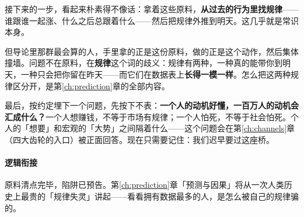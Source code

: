 \documentclass[../../main2.tex]{subfiles}
\begin{document}
	接下来的一步，看起来朴素得不像话：拿着这些原料，\textbf{从过去的行为里找规律}——谁跟谁一起涨、什么之后总跟着什么——然后把规律外推到明天。这几乎就是常识本身。

	但导论里那群最会算的人，手里拿的正是这份原料，做的正是这个动作，然后集体撞墙。问题不在原料，在\textbf{规律}这个词的歧义：规律有两种，一种真的能带你到明天，一种只会把你留在昨天——而它们在数据表上\textbf{长得一模一样}。怎么把这两种规律区分开，是第\ref{ch:prediction}章的全部内容。

	最后，按约定埋下一个问题，先按下不表：\textbf{一个人的动机好懂，一百万人的动机会汇成什么？}一个人想赚钱，不等于市场有规律；一个人怕死，不等于社会怕死。个人的「想要」和宏观的「大势」之间隔着什么——这个问题会在第\ref{ch:channels}章（四大齿轮的入口）被正面回答。现在只需要记住：我们迟早要过这座桥。

	\paragraph*{逻辑衔接}
	原料清点完毕，陷阱已预告。第\ref{ch:prediction}章「预测与因果」将从一次人类历史上最贵的「规律失灵」讲起——看看拥有数据最多的人，是怎么被自己的规律骗的。
\end{document}
